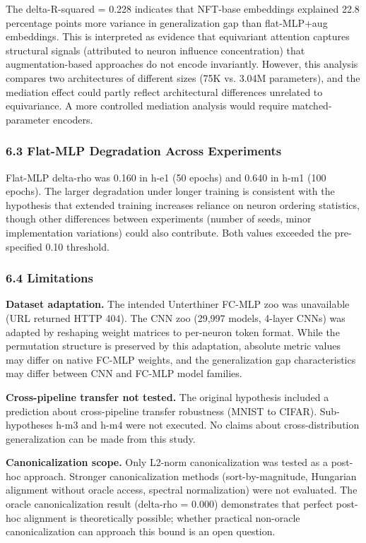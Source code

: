 The delta-R-squared = 0.228 indicates that NFT-base embeddings explained 22.8 percentage points more variance in generalization gap than flat-MLP+aug embeddings. This is interpreted as evidence that equivariant attention captures structural signals (attributed to neuron influence concentration) that augmentation-based approaches do not encode invariantly. However, this analysis compares two architectures of different sizes (75K vs. 3.04M parameters), and the mediation effect could partly reflect architectural differences unrelated to equivariance. A more controlled mediation analysis would require matched-parameter encoders.

\subsubsection{6.3 Flat-MLP Degradation Across Experiments}

Flat-MLP delta-rho was 0.160 in h-e1 (50 epochs) and 0.640 in h-m1 (100 epochs). The larger degradation under longer training is consistent with the hypothesis that extended training increases reliance on neuron ordering statistics, though other differences between experiments (number of seeds, minor implementation variations) could also contribute. Both values exceeded the pre-specified 0.10 threshold.

\subsubsection{6.4 Limitations}

\textbf{Dataset adaptation.} The intended Unterthiner FC-MLP zoo was unavailable (URL returned HTTP 404). The CNN zoo (29,997 models, 4-layer CNNs) was adapted by reshaping weight matrices to per-neuron token format. While the permutation structure is preserved by this adaptation, absolute metric values may differ on native FC-MLP weights, and the generalization gap characteristics may differ between CNN and FC-MLP model families.

\textbf{Cross-pipeline transfer not tested.} The original hypothesis included a prediction about cross-pipeline transfer robustness (MNIST to CIFAR). Sub-hypotheses h-m3 and h-m4 were not executed. No claims about cross-distribution generalization can be made from this study.

\textbf{Canonicalization scope.} Only L2-norm canonicalization was tested as a post-hoc approach. Stronger canonicalization methods (sort-by-magnitude, Hungarian alignment without oracle access, spectral normalization) were not evaluated. The oracle canonicalization result (delta-rho = 0.000) demonstrates that perfect post-hoc alignment is theoretically possible; whether practical non-oracle canonicalization can approach this bound is an open question.

